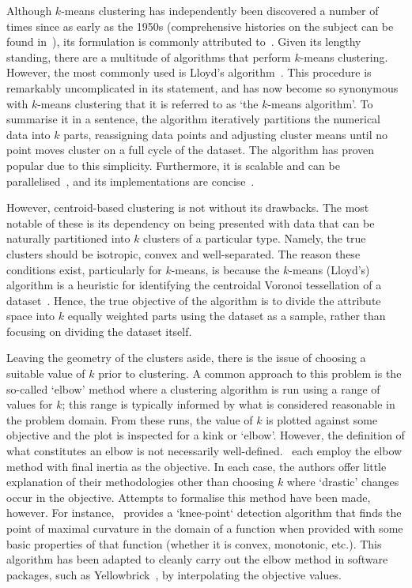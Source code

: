 Although \(k\)-means clustering has independently been discovered a number of
times since as early as the 1950s (comprehensive histories on the subject can be
found in~\cite{Bock2007,Jain2010}), its formulation is commonly attributed
to~\cite{Hartigan1979}. Given its lengthy standing, there are a multitude of
algorithms that perform \(k\)-means clustering. However, the most commonly used
is Lloyd's algorithm~\cite{Lloyd1982}. This procedure is remarkably
uncomplicated in its statement, and has now become so synonymous with
\(k\)-means clustering that it is referred to as `the \(k\)-means algorithm'. To
summarise it in a sentence, the algorithm iteratively partitions the numerical
data into \(k\) parts, reassigning data points and adjusting cluster means until
no point moves cluster on a full cycle of the dataset. The algorithm has proven
popular due to this simplicity. Furthermore, it is scalable and can be
parallelised~\cite{Bahmani2012}, and its implementations are
concise~\cite{Olafsson2008,Wu2009}.

However, centroid-based clustering is not without its drawbacks. The most
notable of these is its dependency on being presented with data that can be
naturally partitioned into \(k\) clusters of a particular type. Namely, the true
clusters should be isotropic, convex and well-separated. The reason these
conditions exist, particularly for \(k\)-means, is because the \(k\)-means
(Lloyd's) algorithm is a heuristic for identifying the centroidal Voronoi
tessellation of a dataset~\cite{Du2006}. Hence, the true objective of the
algorithm is to divide the attribute space into \(k\) equally weighted parts
using the dataset as a sample, rather than focusing on dividing the dataset
itself.

Leaving the geometry of the clusters aside, there is the issue of choosing a
suitable value of \(k\) prior to clustering. A common approach to this problem
is the so-called `elbow' method where a clustering algorithm is run using a
range of values for \(k\); this range is typically informed by what is
considered reasonable in the problem domain. From these runs, the value of \(k\)
is plotted against some objective and the plot is inspected for a kink or
`elbow'.  However, the definition of what constitutes an elbow is not
necessarily well-defined.~\cite{Sujatha2013,Syakur2018} each employ the elbow
method with final inertia as the objective. In each case, the authors offer
little explanation of their methodologies other than choosing \(k\) where
`drastic' changes occur in the objective. Attempts to formalise this method have
been made, however. For instance,~\cite{Satopaa2011} provides a `knee-point`
detection algorithm that finds the point of maximal curvature in the domain of a
function when provided with some basic properties of that function (whether it
is convex, monotonic, etc.). This algorithm has been adapted to cleanly carry
out the elbow method in software packages, such as
Yellowbrick~\cite{Bengfort2019}, by interpolating the objective values.


